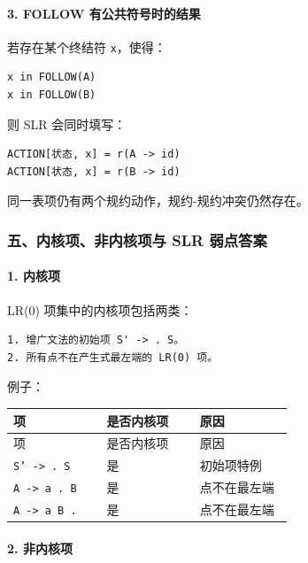 \documentclass[UTF8]{ctexart}
\begin{document}
\paragraph*{3. FOLLOW 有公共符号时的结果}

若存在某个终结符 \texttt{x}，使得：

\begin{Verbatim}[fontsize=\small,breaklines=true]
x in FOLLOW(A)
x in FOLLOW(B)
\end{Verbatim}

则 SLR 会同时填写：

\begin{Verbatim}[fontsize=\small,breaklines=true]
ACTION[状态, x] = r(A -> id)
ACTION[状态, x] = r(B -> id)
\end{Verbatim}

同一表项仍有两个规约动作，规约-规约冲突仍然存在。

\subsubsection*{五、内核项、非内核项与 SLR 弱点答案}

\paragraph*{1. 内核项}

LR(0) 项集中的内核项包括两类：

\begin{Verbatim}[fontsize=\small,breaklines=true]
1. 增广文法的初始项 S' -> . S。
2. 所有点不在产生式最左端的 LR(0) 项。
\end{Verbatim}

例子：

\begin{longtable}{|p{0.31\linewidth}|p{0.31\linewidth}|p{0.31\linewidth}|}
\hline
项 & 是否内核项 & 原因 \\
\hline
\endfirsthead
项 & 是否内核项 & 原因 \\
\hline
\endhead
\texttt{S' -> . S} & 是 & 初始项特例 \\
\hline
\texttt{A -> a . B} & 是 & 点不在最左端 \\
\hline
\texttt{A -> a B .} & 是 & 点不在最左端 \\
\hline
\end{longtable}

\paragraph*{2. 非内核项}
\end{document}
